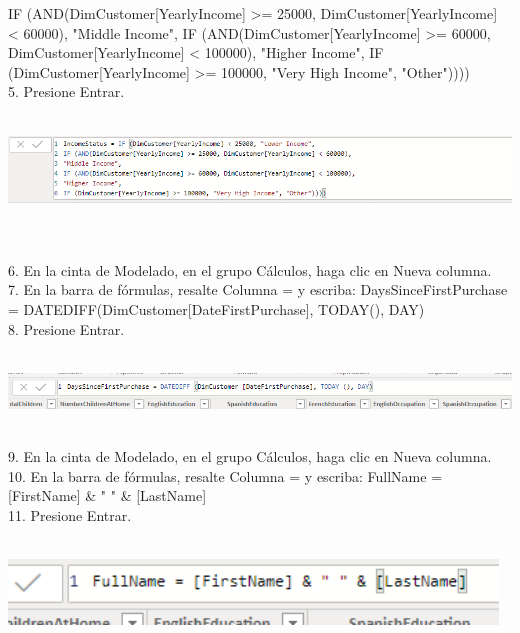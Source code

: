 \begin{flushleft}
\begin{itemize}
IF (AND(DimCustomer[YearlyIncome] >= 25000, DimCustomer[YearlyIncome] < 60000),
"Middle Income",
IF (AND(DimCustomer[YearlyIncome] >= 60000, DimCustomer[YearlyIncome] < 100000),
"Higher Income",
IF (DimCustomer[YearlyIncome] >= 100000, "Very High Income", "Other"))))\\
5. Presione Entrar.\\
\textbf{ }\\
\begin{center}
	\includegraphics[width=17cm]{./Imagenes/img32} 
	\end{center}
\textbf{ }\\
\textbf{ }\\
6. En la cinta de Modelado, en el grupo Cálculos, haga clic en Nueva columna.\\
7. En la barra de fórmulas, resalte Columna = y escriba:
DaysSinceFirstPurchase = DATEDIFF(DimCustomer[DateFirstPurchase], TODAY(), DAY)\\
8. Presione Entrar.\\
\textbf{ }\\
\begin{center}
	\includegraphics[width=17cm]{./Imagenes/img33} 
	\end{center}
\textbf{ }\\



9. En la cinta de Modelado, en el grupo Cálculos, haga clic en Nueva columna.\\
10. En la barra de fórmulas, resalte Columna = y escriba:
FullName = [FirstName] \& " " \& [LastName]\\
11. Presione Entrar.\\
\textbf{ }\\
\begin{center}
	\includegraphics[width=13cm]{./Imagenes/img34} 
	\end{center}
\textbf{ }\\



\end{itemize}
\end{flushleft}
